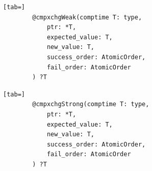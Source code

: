\documentclass[aspectratio=169,listings,handout]{beamer}
\begin{document}
\newsavebox\cmpxweak
\newsavebox\cmpxstrong
\begin{lrbox}{\cmpxweak}\color{black}\footnotesize
	\begin{lstlisting}[tab=]
		@cmpxchgWeak(comptime T: type,
			ptr: *T,
			expected_value: T,
			new_value: T,
			success_order: AtomicOrder,
			fail_order: AtomicOrder
		) ?T
	\end{lstlisting}
\end{lrbox}
\begin{lrbox}{\cmpxstrong}\color{black}\footnotesize
	\begin{lstlisting}[tab=]
		@cmpxchgStrong(comptime T: type,
			ptr: *T,
			expected_value: T,
			new_value: T,
			success_order: AtomicOrder,
			fail_order: AtomicOrder
		) ?T
	\end{lstlisting}
\end{lrbox}
\end{document}
